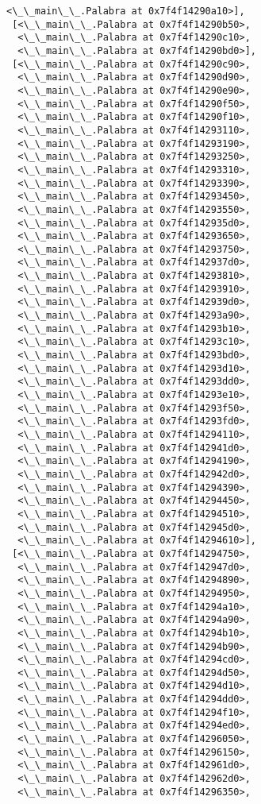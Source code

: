 \documentclass[12pt,a4paper,table]{article}
\begin{document}
\begin{tcolorbox}[breakable, size=fbox, boxrule=.5pt, pad at break*=1mm, opacityfill=0]
\begin{Verbatim}[commandchars=\\\{\}]
  <\_\_main\_\_.Palabra at 0x7f4f14290a10>],
 [<\_\_main\_\_.Palabra at 0x7f4f14290b50>,
  <\_\_main\_\_.Palabra at 0x7f4f14290c10>,
  <\_\_main\_\_.Palabra at 0x7f4f14290bd0>],
 [<\_\_main\_\_.Palabra at 0x7f4f14290c90>,
  <\_\_main\_\_.Palabra at 0x7f4f14290d90>,
  <\_\_main\_\_.Palabra at 0x7f4f14290e90>,
  <\_\_main\_\_.Palabra at 0x7f4f14290f50>,
  <\_\_main\_\_.Palabra at 0x7f4f14290f10>,
  <\_\_main\_\_.Palabra at 0x7f4f14293110>,
  <\_\_main\_\_.Palabra at 0x7f4f14293190>,
  <\_\_main\_\_.Palabra at 0x7f4f14293250>,
  <\_\_main\_\_.Palabra at 0x7f4f14293310>,
  <\_\_main\_\_.Palabra at 0x7f4f14293390>,
  <\_\_main\_\_.Palabra at 0x7f4f14293450>,
  <\_\_main\_\_.Palabra at 0x7f4f14293550>,
  <\_\_main\_\_.Palabra at 0x7f4f142935d0>,
  <\_\_main\_\_.Palabra at 0x7f4f14293650>,
  <\_\_main\_\_.Palabra at 0x7f4f14293750>,
  <\_\_main\_\_.Palabra at 0x7f4f142937d0>,
  <\_\_main\_\_.Palabra at 0x7f4f14293810>,
  <\_\_main\_\_.Palabra at 0x7f4f14293910>,
  <\_\_main\_\_.Palabra at 0x7f4f142939d0>,
  <\_\_main\_\_.Palabra at 0x7f4f14293a90>,
  <\_\_main\_\_.Palabra at 0x7f4f14293b10>,
  <\_\_main\_\_.Palabra at 0x7f4f14293c10>,
  <\_\_main\_\_.Palabra at 0x7f4f14293bd0>,
  <\_\_main\_\_.Palabra at 0x7f4f14293d10>,
  <\_\_main\_\_.Palabra at 0x7f4f14293dd0>,
  <\_\_main\_\_.Palabra at 0x7f4f14293e10>,
  <\_\_main\_\_.Palabra at 0x7f4f14293f50>,
  <\_\_main\_\_.Palabra at 0x7f4f14293fd0>,
  <\_\_main\_\_.Palabra at 0x7f4f14294110>,
  <\_\_main\_\_.Palabra at 0x7f4f142941d0>,
  <\_\_main\_\_.Palabra at 0x7f4f14294190>,
  <\_\_main\_\_.Palabra at 0x7f4f142942d0>,
  <\_\_main\_\_.Palabra at 0x7f4f14294390>,
  <\_\_main\_\_.Palabra at 0x7f4f14294450>,
  <\_\_main\_\_.Palabra at 0x7f4f14294510>,
  <\_\_main\_\_.Palabra at 0x7f4f142945d0>,
  <\_\_main\_\_.Palabra at 0x7f4f14294610>],
 [<\_\_main\_\_.Palabra at 0x7f4f14294750>,
  <\_\_main\_\_.Palabra at 0x7f4f142947d0>,
  <\_\_main\_\_.Palabra at 0x7f4f14294890>,
  <\_\_main\_\_.Palabra at 0x7f4f14294950>,
  <\_\_main\_\_.Palabra at 0x7f4f14294a10>,
  <\_\_main\_\_.Palabra at 0x7f4f14294a90>,
  <\_\_main\_\_.Palabra at 0x7f4f14294b10>,
  <\_\_main\_\_.Palabra at 0x7f4f14294b90>,
  <\_\_main\_\_.Palabra at 0x7f4f14294cd0>,
  <\_\_main\_\_.Palabra at 0x7f4f14294d50>,
  <\_\_main\_\_.Palabra at 0x7f4f14294d10>,
  <\_\_main\_\_.Palabra at 0x7f4f14294dd0>,
  <\_\_main\_\_.Palabra at 0x7f4f14294f10>,
  <\_\_main\_\_.Palabra at 0x7f4f14294ed0>,
  <\_\_main\_\_.Palabra at 0x7f4f14296050>,
  <\_\_main\_\_.Palabra at 0x7f4f14296150>,
  <\_\_main\_\_.Palabra at 0x7f4f142961d0>,
  <\_\_main\_\_.Palabra at 0x7f4f142962d0>,
  <\_\_main\_\_.Palabra at 0x7f4f14296350>,

\end{Verbatim}
\end{tcolorbox}
\end{document}
